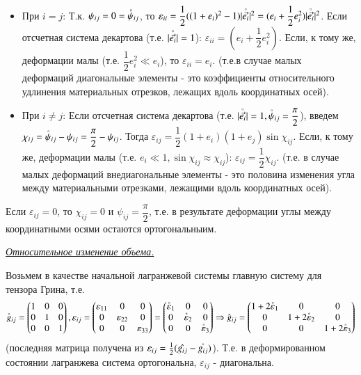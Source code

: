 \begin{itemize}	
	\item При $i = j$: Т.к. $\psi_{ij} = 0 = \accentset{\circ}{\psi}_{ij}$, то 
	$\varepsilon_{ii} = \dfrac{1}{2}((1+e_i)^2 - 1)|\accentset{\circ}{\vec{e_i}}|^2 = (e_i + \dfrac{1}{2}e_i^2)|\accentset{\circ}{\vec{e_i}}|^2$.
	Если отсчетная система декартова (т.е. $|\accentset{\circ}{\vec{e_i}}| = 1$): $\varepsilon_{ii} = (e_i + \dfrac{1}{2}e_i^2)$. Если, к тому же, деформации малы (т.е. $\dfrac{1}{2}e_i^2 \ll e_i$), то $\varepsilon_{ii} = e_i$. (т.е.в случае малых деформаций диагональные элементы - это коэффициенты относительного удлинения материальных отрезков, лежащих вдоль координатных осей).
	\item При $i \not= j$: Если отсчетная система декартова (т.е. $|\accentset{\circ}{\vec{e_i}}| = 1, \accentset{\circ}{\psi}_{ij} = \dfrac{\pi}{2}$), введем $\chi_{ij} = \accentset{\circ}{\psi}_{ij} - \psi_{ij} = \dfrac{\pi}{2} - \psi_{ij}$. Тогда $\varepsilon_{ij} = \dfrac{1}{2}(1+e_i)(1+e_j)\sin{\chi_{ij}}$. Если, к тому же, деформации малы (т.е. $e_i \ll 1, \sin \chi_{ij} \approx \chi_{ij}$): $\varepsilon_{ij} = \dfrac{1}{2}\chi_{ij}$. (т.е. в случае малых деформаций внедиагональные элементы - это половина изменения угла между материальными отрезками, лежащими вдоль координатных осей).
\end{itemize}

Если $\varepsilon_{ij} = 0$, то $\chi_{ij} = 0$ и $\psi_{ij} = \dfrac{\pi}{2}$, т.е. в результате деформации углы между координатными осями остаются ортогональныим.

\begin{center}
	\textit{\underline{Относительное изменение объема.}}
\end{center}

Возьмем в качестве начальной лагранжевой системы главную систему для тензора Грина, т.е. 
$$
\accentset{\circ}{g}_{ij} = 
\begin{pmatrix} 
1 & 0 & 0 \\
0 & 1 & 0 \\
0 & 0 & 1 
\end{pmatrix},
\varepsilon_{ij} = 
\begin{pmatrix} 
\varepsilon_{11} & 0 & 0 \\
0 & \varepsilon_{22} & 0 \\
0 & 0 & \varepsilon_{33}
\end{pmatrix} = 
\begin{pmatrix} 
\accentset{\circ}{\varepsilon}_{1} & 0 & 0 \\
0 & \accentset{\circ}{\varepsilon}_{2} & 0 \\
0 & 0 & \accentset{\circ}{\varepsilon}_{3}
\end{pmatrix}
\Rightarrow
\hat g_{ij} = 
\begin{pmatrix} 
1+2\accentset{\circ}{\varepsilon}_{1} & 0 & 0 \\
0 & 1+2\accentset{\circ}{\varepsilon}_{2} & 0 \\
0 & 0 & 1+2\accentset{\circ}{\varepsilon}_{3}
\end{pmatrix}
$$
(последняя матрица получена из $\varepsilon_{ij} = \frac{1}{2}(\hat{g_{ij}} - \accentset{\circ}{g_{ij}})$). Т.е. в деформированном состоянии лагранжева система ортогональна, $\varepsilon_{ij}$ - диагональна.

